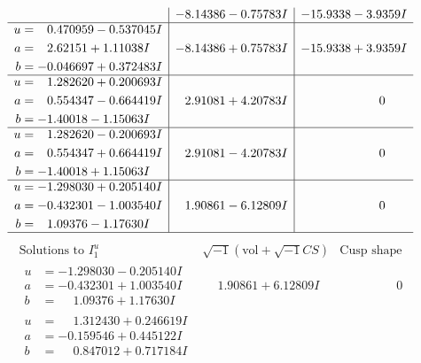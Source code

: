 \documentclass[1p]{elsarticle_modified}
\theoremstyle{definition}
\newcommand{\I}{\sqrt{-1}}
\begin{document}
$$\begin{array}{c|c|c}
 & -8.14386 - 0.75783 I & -15.9338 - 3.9359 I \\ \hline\begin{aligned}
u &= \phantom{-}0.470959 - 0.537045 I \\
a &= \phantom{-}2.62151 + 1.11038 I \\
b &= -0.046697 + 0.372483 I\end{aligned}
 & -8.14386 + 0.75783 I & -15.9338 + 3.9359 I \\ \hline\begin{aligned}
u &= \phantom{-}1.282620 + 0.200693 I \\
a &= \phantom{-}0.554347 - 0.664419 I \\
b &= -1.40018 - 1.15063 I\end{aligned}
 & \phantom{-}2.91081 + 4.20783 I & \phantom{-0.000000 } 0 \\ \hline\begin{aligned}
u &= \phantom{-}1.282620 - 0.200693 I \\
a &= \phantom{-}0.554347 + 0.664419 I \\
b &= -1.40018 + 1.15063 I\end{aligned}
 & \phantom{-}2.91081 - 4.20783 I & \phantom{-0.000000 } 0 \\ \hline\begin{aligned}
u &= -1.298030 + 0.205140 I \\
a &= -0.432301 - 1.003540 I \\
b &= \phantom{-}1.09376 - 1.17630 I\end{aligned}
 & \phantom{-}1.90861 - 6.12809 I & \phantom{-0.000000 } 0\\
 \hline 
 \end{array}$$\newpage$$\begin{array}{c|c|c}  
\text{Solutions to }I^u_{1}& \I (\text{vol} + \sqrt{-1}CS) & \text{Cusp shape}\\
 \hline 
\begin{aligned}
u &= -1.298030 - 0.205140 I \\
a &= -0.432301 + 1.003540 I \\
b &= \phantom{-}1.09376 + 1.17630 I\end{aligned}
 & \phantom{-}1.90861 + 6.12809 I & \phantom{-0.000000 } 0 \\ \hline\begin{aligned}
u &= \phantom{-}1.312430 + 0.246619 I \\
a &= -0.159546 + 0.445122 I \\
b &= \phantom{-}0.847012 + 0.717184 I\end{aligned}

\end{array}$$
\end{document}
